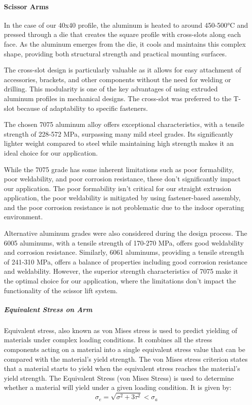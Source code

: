 \documentclass[../../main]{subfiles}
\begin{document}
\paragraph{Scissor Arms}

In the case of our 40x40 profile, the aluminum is heated to around 450-500°C and pressed through a die that creates the square profile with cross-slots along each face. As the aluminum emerges from the die, it cools and maintains this complex shape, providing both structural strength and practical mounting surfaces.

The cross-slot design is particularly valuable as it allows for easy attachment of accessories, brackets, and other components without the need for welding or drilling. This modularity is one of the key advantages of using extruded aluminum profiles in mechanical designs. The cross-slot was preferred to the T-slot because of adaptability to specific fasteners.

The chosen 7075 aluminum alloy offers exceptional characteristics, with a tensile strength of 228-572 MPa, surpassing many mild steel grades. Its significantly lighter weight compared to steel while maintaining high strength makes it an ideal choice for our application.

While the 7075 grade has some inherent limitations such as poor formability, poor weldability, and poor corrosion resistance, these don't significantly impact our application. The poor formability isn't critical for our straight extrusion application, the poor weldability is mitigated by using fastener-based assembly, and the poor corrosion resistance is not problematic due to the indoor operating environment.

Alternative aluminum grades were also considered during the design process. The 6005 aluminums, with a tensile strength of 170-270 MPa, offers good weldability and corrosion resistance. Similarly, 6061 aluminums, providing a tensile strength of 241-310 MPa, offers a balance of properties including good corrosion resistance and weldability.
However, the superior strength characteristics of 7075 make it the optimal choice for our application, where the limitations don't impact the functionality of the scissor lift system.

\subparagraph{Equivalent Stress on Arm}

Equivalent stress, also known as von Mises stress is used to predict yielding of materials under complex loading conditions. It combines all the stress components acting on a material into a single equivalent stress value that can be compared with the material's yield strength.
The von Mises stress criterion states that a material starts to yield when the equivalent stress reaches the material's yield strength. 
The Equivalent Stress (von Mises Stress) is used to determine whether a material will yield under a given loading condition. It is given by:
\begin{equation}
  \sigma_e = \sqrt{\sigma^2 + 3\tau^2} < \sigma_a
\end{equation}
\end{document}
